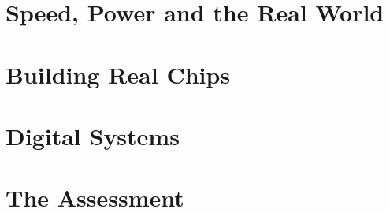 \documentclass[11pt,openany]{book}
\begin{document}
\part{Speed, Power and the Real World}




\part{Building Real Chips}




\part{Digital Systems}





\part{The Assessment}




\appendix





\end{document}
